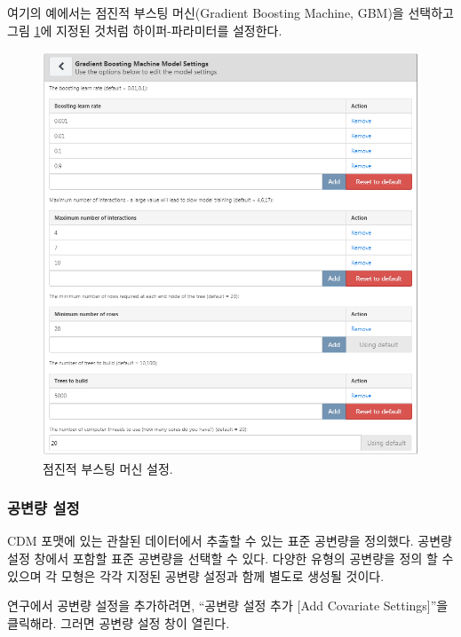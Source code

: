 \documentclass[11pt]{book}
\theoremstyle{definition}
\theoremstyle{definition}
\theoremstyle{definition}
\theoremstyle{remark}
\begin{document}
여기의 예에서는 점진적 부스팅 머신(Gradient Boosting Machine, GBM)을
선택하고 그림 \ref{fig:gbmSettings}에 지정된 것처럼 하이퍼-파라미터를
설정한다.

\begin{figure}

{\centering \includegraphics[width=1\linewidth]{images/PatientLevelPrediction/gbmSettings} 

}

\caption{점진적 부스팅 머신 설정.}\label{fig:gbmSettings}
\end{figure}

\subsubsection*{공변량 설정}\label{--1}

CDM 포맷에 있는 관찰된 데이터에서 추출할 수 있는 표준 공변량을 정의했다.
공변량 설정 창에서 포함할 표준 공변량을 선택할 수 있다. 다양한 유형의
공변량을 정의 할 수 있으며 각 모형은 각각 지정된 공변량 설정과 함께
별도로 생성될 것이다.

연구에서 공변량 설정을 추가하려면, ``공변량 설정 추가 {[}Add Covariate
Settings{]}''을 클릭해라. 그러면 공변량 설정 창이 열린다.
\end{document}
